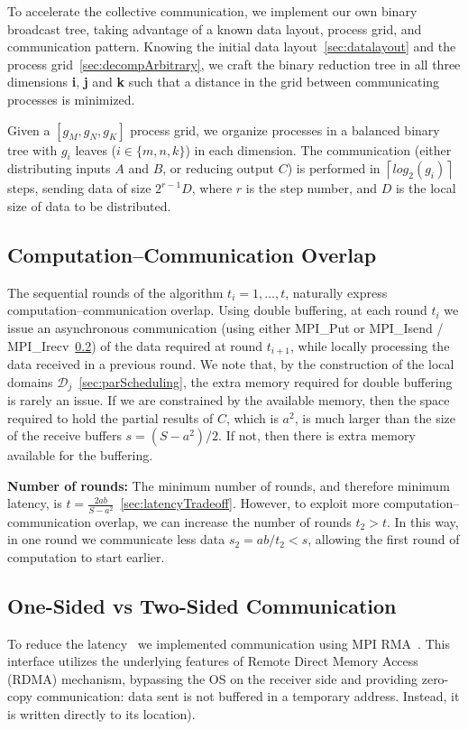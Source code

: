 \documentclass[sigplan,review,anonymous,10pt]{acmart}\settopmatter{printfolios=true,printccs=false,printacmref=false}
\newcommand{\macb}[1]{\textbf{\textsf{#1}}}
\begin{document}
To accelerate the collective communication, we implement our own binary 
broadcast 
tree, taking advantage of a known data layout, process grid, and communication 
pattern.
 Knowing the initial data 
layout~\cref{sec:datalayout} and the process 
grid~\cref{sec:decompArbitrary}, we craft the binary reduction tree 
in all three dimensions \textbf{i}, \textbf{j} and \textbf{k} such that a 
distance in the grid between communicating processes is minimized. 

Given a $[g_M, g_N, g_K]$ process grid, we organize processes 
in a balanced binary tree with $g_i$ leaves ($i \in \{m,n,k\}$) in each 
dimension. The 
communication 
(either distributing inputs $A$ and $B$, or reducing output $C$) is performed 
in 
$\left \lceil{log_2(g_i)} \right \rceil$ steps, sending data of size $2^{r-1} 
D$, where $r$ is the step 
number, and $D$ is the local size of data to be distributed.

\subsection{Computation--Communication Overlap}
\label{sec:compOverlap}
The sequential rounds of the algorithm $t_i = 1, \dots, t$, 
naturally express 
computation--communication overlap. Using double buffering, at each round $t_i$ 
we issue an asynchronous communication (using either MPI\_Put or 
MPI\_Isend / MPI\_Irecv~\cref{sec:rdma}) of the data required at round 
$t_{i+1}$, 
while locally processing the data received in a previous round. We note that, 
by the construction of the local domains 
$\mathcal{D}_j$~\cref{sec:parScheduling}, the extra memory required for double 
buffering is rarely an issue. If we are constrained by the available memory, 
then the space required to hold the partial results of $C$, which is $a^2$, is 
much larger than the size of the receive buffers $s =(S - 
a^2)/2$. If not, then there is extra memory available for the buffering.

\macb{Number of rounds:} The minimum number of rounds, and therefore minimum 
latency, is $t= \frac{2ab}{S-a^2}$~\cref{sec:latencyTradeoff}. However, to 
exploit more computation--communication overlap, we can increase 
the number of rounds $t_2 > t$. In this way, in one round we communicate less 
data $s_2 = ab/t_2 < s$, allowing the first round of computation to start 
earlier.

\subsection{One-Sided vs Two-Sided Communication}
\label{sec:rdma}
To reduce the latency~\cite{fompi} we implemented communication 
using MPI RMA~\cite{mpi3-rma-overview}. This interface utilizes the 
underlying features of Remote Direct Memory Access (RDMA) mechanism, bypassing 
the OS on the receiver side and providing zero-copy communication: data sent is 
not buffered in a temporary address. Instead, it is written directly to its 
location).
\end{document}
